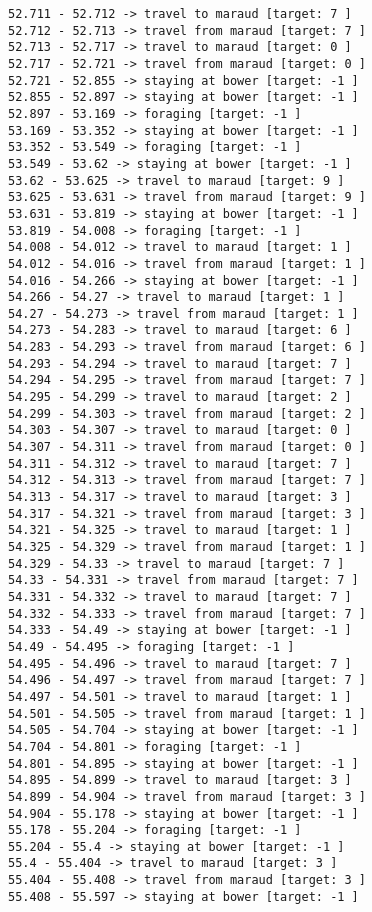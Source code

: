 \documentclass[11pt]{article}
\begin{document}
\begin{Verbatim}[commandchars=\\\{\}]
52.711 - 52.712 -> travel to maraud [target: 7 ]
52.712 - 52.713 -> travel from maraud [target: 7 ]
52.713 - 52.717 -> travel to maraud [target: 0 ]
52.717 - 52.721 -> travel from maraud [target: 0 ]
52.721 - 52.855 -> staying at bower [target: -1 ]
52.855 - 52.897 -> staying at bower [target: -1 ]
52.897 - 53.169 -> foraging [target: -1 ]
53.169 - 53.352 -> staying at bower [target: -1 ]
53.352 - 53.549 -> foraging [target: -1 ]
53.549 - 53.62 -> staying at bower [target: -1 ]
53.62 - 53.625 -> travel to maraud [target: 9 ]
53.625 - 53.631 -> travel from maraud [target: 9 ]
53.631 - 53.819 -> staying at bower [target: -1 ]
53.819 - 54.008 -> foraging [target: -1 ]
54.008 - 54.012 -> travel to maraud [target: 1 ]
54.012 - 54.016 -> travel from maraud [target: 1 ]
54.016 - 54.266 -> staying at bower [target: -1 ]
54.266 - 54.27 -> travel to maraud [target: 1 ]
54.27 - 54.273 -> travel from maraud [target: 1 ]
54.273 - 54.283 -> travel to maraud [target: 6 ]
54.283 - 54.293 -> travel from maraud [target: 6 ]
54.293 - 54.294 -> travel to maraud [target: 7 ]
54.294 - 54.295 -> travel from maraud [target: 7 ]
54.295 - 54.299 -> travel to maraud [target: 2 ]
54.299 - 54.303 -> travel from maraud [target: 2 ]
54.303 - 54.307 -> travel to maraud [target: 0 ]
54.307 - 54.311 -> travel from maraud [target: 0 ]
54.311 - 54.312 -> travel to maraud [target: 7 ]
54.312 - 54.313 -> travel from maraud [target: 7 ]
54.313 - 54.317 -> travel to maraud [target: 3 ]
54.317 - 54.321 -> travel from maraud [target: 3 ]
54.321 - 54.325 -> travel to maraud [target: 1 ]
54.325 - 54.329 -> travel from maraud [target: 1 ]
54.329 - 54.33 -> travel to maraud [target: 7 ]
54.33 - 54.331 -> travel from maraud [target: 7 ]
54.331 - 54.332 -> travel to maraud [target: 7 ]
54.332 - 54.333 -> travel from maraud [target: 7 ]
54.333 - 54.49 -> staying at bower [target: -1 ]
54.49 - 54.495 -> foraging [target: -1 ]
54.495 - 54.496 -> travel to maraud [target: 7 ]
54.496 - 54.497 -> travel from maraud [target: 7 ]
54.497 - 54.501 -> travel to maraud [target: 1 ]
54.501 - 54.505 -> travel from maraud [target: 1 ]
54.505 - 54.704 -> staying at bower [target: -1 ]
54.704 - 54.801 -> foraging [target: -1 ]
54.801 - 54.895 -> staying at bower [target: -1 ]
54.895 - 54.899 -> travel to maraud [target: 3 ]
54.899 - 54.904 -> travel from maraud [target: 3 ]
54.904 - 55.178 -> staying at bower [target: -1 ]
55.178 - 55.204 -> foraging [target: -1 ]
55.204 - 55.4 -> staying at bower [target: -1 ]
55.4 - 55.404 -> travel to maraud [target: 3 ]
55.404 - 55.408 -> travel from maraud [target: 3 ]
55.408 - 55.597 -> staying at bower [target: -1 ]

\end{Verbatim}
\end{document}
